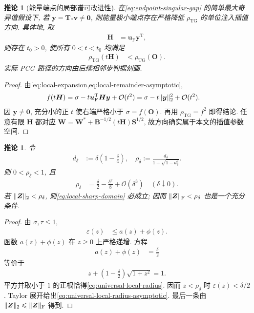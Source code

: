 \documentclass{ctexart}
\newcommand{\q}{\quad}
\newcommand{\T}{\mathrm{T}}
\renewcommand{\O}{\mathcal{O}}
\newcommand{\dt}{\delta}
\renewcommand{\ge}{\geqslant}
\renewcommand{\le}{\leqslant}
\DeclarePairedDelimiter\norm{\lVert}{\rVert}
\newtheorem{corollary}[theorem]{推论}
\begin{document}
\begin{corollary}[能量端点的局部谱可改进性]
\label{cor:endpoint-not-local-tg-optimum}
在\cref{eq:endpoint-singular-gap} 的简单最大奇异值假设下, 若
$\bm y=\bm T_\ast\bm v\ne\mathbf0$, 则能量极小端点存在严格降低
$\rho_{\mathrm{TG}}$ 的单位注入插值方向. 具体地, 取
\begin{align}
  \bm H&=\bm u_{\mathrm F}\bm y^\T,
  \label{eq:endpoint-descent-direction}
\end{align}
则存在 $t_0>0$, 使所有 $0<t<t_0$ 均满足
\begin{align}
  \rho_{\mathrm{TG}}(t\bm H)
  &<\rho_{\mathrm{TG}}(\mathbf O).
  \label{eq:endpoint-strict-nonoptimality}
\end{align}
实际 PCG 路径的方向由后续相邻步判据刻画.
\end{corollary}

\begin{proof}
由\cref{eq:local-expansion,eq:local-remainder-asymptotic},
\begin{align}
 f(t\bm H)
 &=\sigma-t\bm u_{\mathrm F}^\T\bm H\bm y+\O(t^2)
 =\sigma-t\norm{\bm y}_2^2+\O(t^2).
 \label{eq:endpoint-descent-expansion}
\end{align}
因 $\bm y\ne\mathbf0$, 充分小的正 $t$ 使右端严格小于 $\sigma=f(\mathbf O)$. 再用 $\rho_{\mathrm{TG}}=f^2$ 即得结论. 任意有限 $\bm H$ 都对应
$\bm W=\bm W^\ast+\bm B^{-1/2}(t\bm H)\bm S^{1/2}$,
故方向确实属于本文的插值参数空间.
\end{proof}

\begin{corollary}
\label{cor:universal-local-radius}
令
\begin{align}
    d_\dt&:=\dt\left(1-\frac\dt4\right),\q
    \rho_\dt:=\frac{d_\dt}{1+\sqrt{1-d_\dt^2}}.
    \label{eq:universal-local-radius}
\end{align}
则 $0<\rho_\dt<1$, 且
\begin{align}
    \rho_\dt&=\frac\dt2-\frac{\dt^2}{8}+\O(\dt^3)
    \q(\dt\downarrow0).
    \label{eq:universal-local-radius-asymptotic}
\end{align}
若 $\norm{\bm Z}_2<\rho_\dt$, 则\cref{eq:local-sharp-domain} 必成立; 因而 $\norm{\bm Z}_{\mathrm F}<\rho_\dt$ 也是一个充分条件.
\end{corollary}

\begin{proof}
由 $\sigma,\tau\le1$,
\begin{align}
    \varepsilon(z)&\le a(z)+\phi(z).
    \label{eq:local-epsilon-universal-bound}
\end{align}
函数 $a(z)+\phi(z)$ 在 $z\ge0$ 上严格递增. 方程
\begin{align}
    a(z)+\phi(z)&=\frac\dt2
    \label{eq:universal-radius-equation}
\end{align}
等价于
\begin{align}
    z+\left(1-\frac\dt2\right)\sqrt{1+z^2}=1.
    \label{eq:universal-radius-equation-expanded}
\end{align}
平方并取小于 $1$ 的正根恰得\cref{eq:universal-local-radius}. 因而 $z<\rho_\dt$ 时 $\varepsilon(z)<\dt/2$. Taylor 展开给出\cref{eq:universal-local-radius-asymptotic}. 最后一条由 $\norm{\bm Z}_2\le\norm{\bm Z}_{\mathrm F}$ 得到.
\end{proof}
\end{document}
